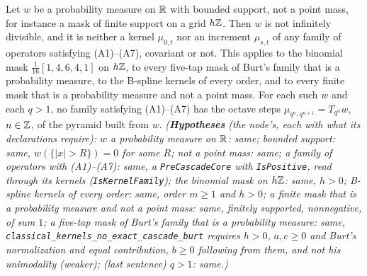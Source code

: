 \begin{proposition}
\label{prop:classical-kernels-no-exact-cascade}
\leanok
{}
Let $w$ be a probability measure on $\mathbb{R}$ with bounded support, not a point mass, for instance a
mask of finite support on a grid $h\mathbb{Z}$. Then $w$ is not infinitely divisible, and it is neither a
kernel $\mu_{0,t}$ nor an increment $\mu_{s,t}$ of any family of operators satisfying (A1)--(A7),
covariant or not. This applies to the binomial mask $\tfrac1{16}[1,4,6,4,1]$ on $h\mathbb{Z}$, to every
five-tap mask of Burt's family that is a probability measure, to the B-spline kernels of every
order, and to every finite mask that is a probability measure and not a point mass. For each such
$w$ and each $q > 1$, no family satisfying
(A1)--(A7) has the octave steps $\mu_{q^n,q^{n+1}} = T_{q^n}w$, $n \in \mathbb{Z}$, of the pyramid built
from $w$.
\statusT\quad\emph{(\textbf{Hypotheses} (the node's, each with what its declarations require): $w$ a
probability measure on $\mathbb{R}$: same; bounded support: same, $w(\{|x| > R\}) = 0$ for some $R$; not
a point mass: same; a family of operators with (A1)--(A7): same, a \texttt{PreCascadeCore} with
\texttt{IsPositive}, read through its kernels (\texttt{IsKernelFamily}); the binomial mask on
$h\mathbb{Z}$: same, $h > 0$; B-spline kernels of every order: same, order $m \ge 1$ and $h > 0$; a
finite mask that is a probability measure and not a point mass: same, finitely supported,
nonnegative, of sum $1$; a five-tap mask of Burt's family that is a probability measure: same,
\texttt{classical\_kernels\_no\_exact\_cascade\_burt} requires $h > 0$, $a, c \ge 0$ and Burt's
normalization and equal contribution, $b \ge 0$ following from them, and not his unimodality
(weaker); (last sentence)
$q > 1$: same.)}
\end{proposition}

